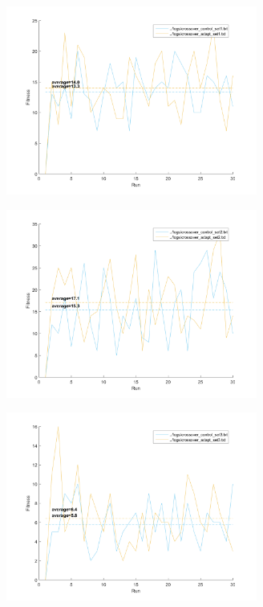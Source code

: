 \documentclass[11pt]{article}
\begin{document}
\begin{figure}[h]
\begin{minipage}{.5\textwidth}
	\includegraphics[width=3.25in]{assn1c_graph_crossover_adapt_set1.png}
  \label{fig:crossoverset1}
\end{minipage}%
\begin{minipage}{.5\textwidth}
  \includegraphics[width=3.25in]{assn1c_graph_crossover_adapt_set2.png}
  \label{fig:crossoverset2}
\end{minipage}
\end{figure}
\begin{figure}[h]
	\centering
  \includegraphics[width=3.25in]{assn1c_graph_crossover_adapt_set3.png}
  \label{fig:crossoverset3}
\end{figure}
\end{document}
